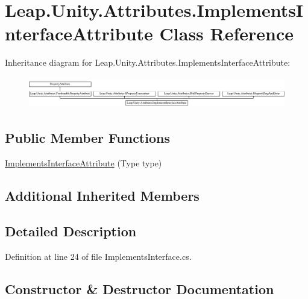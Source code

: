 \hypertarget{class_leap_1_1_unity_1_1_attributes_1_1_implements_interface_attribute}{}\section{Leap.\+Unity.\+Attributes.\+Implements\+Interface\+Attribute Class Reference}
\label{class_leap_1_1_unity_1_1_attributes_1_1_implements_interface_attribute}
Inheritance diagram for Leap.\+Unity.\+Attributes.\+Implements\+Interface\+Attribute\+:\begin{figure}[H]
\begin{center}
\leavevmode
\includegraphics[height=1.386139cm]{class_leap_1_1_unity_1_1_attributes_1_1_implements_interface_attribute}
\end{center}
\end{figure}
\subsection*{Public Member Functions}
\begin{DoxyCompactItemize}
\item 
\mbox{\hyperlink{class_leap_1_1_unity_1_1_attributes_1_1_implements_interface_attribute_a1dd460b87ace21b04011095a6bf364e9}{Implements\+Interface\+Attribute}} (Type type)
\end{DoxyCompactItemize}
\subsection*{Additional Inherited Members}


\subsection{Detailed Description}


Definition at line 24 of file Implements\+Interface.\+cs.



\subsection{Constructor \& Destructor Documentation}
\mbox{\label{class_leap_1_1_unity_1_1_attributes_1_1_implements_interface_attribute_a1dd460b87ace21b04011095a6bf364e9}} 
